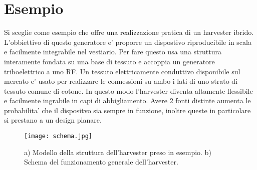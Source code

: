 \chapter{Esempio}
    Si sceglie come esempio \cite{kouWearableAllFabricHybrid2024} che offre una realizzazione pratica di un harvester ibrido. L'obbiettivo di questo generatore e' proporre un dispostivo riproducibile in scala e facilmente integrabile nel vestiario. Per fare questo usa una struttura interamente fondata su una base di tessuto e accoppia un generatore triboelettrico a uno RF. Un tessuto elettricamente conduttivo disponibile sul mercato e' usato per realizzare le connessioni su ambo i lati di uno strato di tessuto comune di cotone. In questo modo l'harvester diventa altamente flessibile e facilmente ingrabile in capi di abbigliamento. Avere 2 fonti distinte aumenta le probabilita' che il dispositvo sia sempre in funzione, inoltre queste in particolare si prestano a un design planare.
    
    \begin{figure}[hbt!]
        \texttt{[image: schema.jpg]}
        \centering
        \caption{a) Modello della struttura dell'harvester preso in esempio. b) Schema del funzionamento generale dell'harvester.}
    \end{figure}

